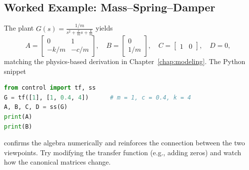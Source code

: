 \subsection{Worked Example: Mass--Spring--Damper}
The plant $G(s) = \frac{1/m}{s^2 + \frac{c}{m} s + \frac{k}{m}}$ yields
\[
    A = \begin{bmatrix} 0 & 1 \\ -k/m & -c/m \end{bmatrix}, \quad
    B = \begin{bmatrix} 0 \\ 1/m \end{bmatrix}, \quad
    C = \begin{bmatrix} 1 & 0 \end{bmatrix}, \quad
    D = 0,
\]
matching the physics-based derivation in Chapter~\ref{chap:modeling}. The Python snippet
\begin{lstlisting}[language=python]
from control import tf, ss
G = tf([1], [1, 0.4, 4])      # m = 1, c = 0.4, k = 4
A, B, C, D = ss(G)
print(A)
print(B)
\end{lstlisting}
confirms the algebra numerically and reinforces the connection between the two viewpoints. Try modifying the transfer function (e.g., adding zeros) and watch how the canonical matrices change.

